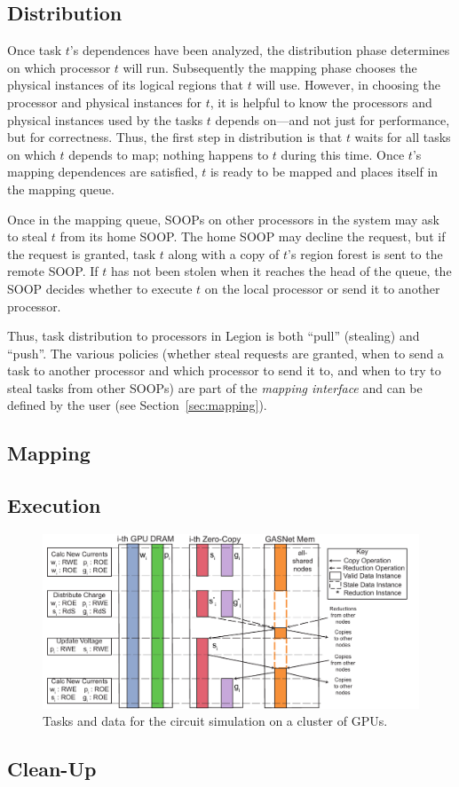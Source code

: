 \subsection{Distribution}
\label{sec:dist}

Once task $t$'s dependences have been analyzed, the distribution phase
determines on which processor $t$ will run.  Subsequently the
mapping phase chooses the physical instances of its logical
regions that $t$ will use.  However, in choosing the processor and
physical instances for $t$, it is helpful to know the processors and
physical instances used by the tasks $t$ depends on---and not just for
performance, but for correctness.  Thus, the first step in
distribution is that $t$ waits for all tasks on which $t$ depends to
map; nothing happens to $t$ during this time.  Once $t$'s mapping
dependences are satisfied, $t$ is ready to be mapped and places
itself in the mapping queue.

Once in the mapping queue, SOOPs on other processors in the system may
ask to steal $t$ from its home SOOP.  The home SOOP may decline the
request, but if the request is granted, task $t$ along with a copy of
$t$'s region forest is sent to the remote SOOP.  If $t$ has not been
stolen when it reaches the head of the queue, the SOOP decides whether
to execute $t$ on the local processor or send it to another processor.

Thus, task distribution to processors in Legion is both ``pull'' (stealing) and ``push''.
The various policies (whether steal requests are granted, when to send
a task to another processor and which processor to send it to, and when to
try to steal tasks from other SOOPs) are part of the {\em mapping interface}
and can be defined by the user (see Section~\ref{sec:mapping}).


\subsection{Mapping}
\label{sec:map}




\subsection{Execution}
\label{sec:exec}

\begin{figure}
\includegraphics[scale=0.48]{figs/CircuitMem.pdf}
\caption{Tasks and data for the circuit simulation on a cluster of GPUs.}
\end{figure}

\subsection{Clean-Up}
\label{sec:clean}


